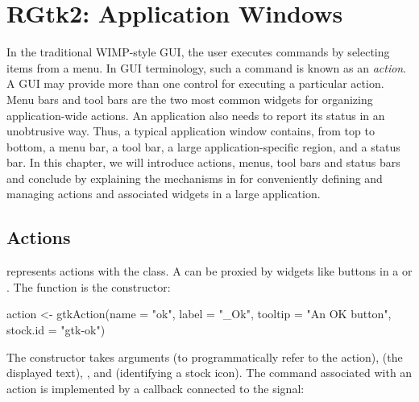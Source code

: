 




\chapter{RGtk2: Application Windows}
\label{sec:RGtk2-menus}


In the traditional WIMP-style GUI, the user executes commands by
selecting items from a menu. In GUI terminology, such a command is
known as an \textit{action}. A GUI may provide more than one control
for executing a particular action. Menu bars and tool bars are the two
most common widgets for organizing application-wide actions. An
application also needs to report its status in an unobtrusive
way. Thus, a typical application window contains, from top to bottom, 
a menu bar, a tool bar, a large application-specific region, and a
status bar.  In this chapter, we will introduce actions, menus,
tool bars and status bars and conclude by explaining the mechanisms in
\GTK\/ for conveniently defining and managing actions and associated
widgets in a large application.


\section{Actions}
\label{sec:RGtk2:actions}


\GTK\/ represents actions with the  class. A
 can be proxied by widgets like buttons in a
 or .  The 
function is the constructor:
\begin{Schunk}
\begin{Sinput}
 action <- gtkAction(name = "ok", label = "_Ok", 
              tooltip = "An OK button", stock.id = "gtk-ok")
\end{Sinput}
\end{Schunk}
%
The constructor takes arguments  (to
programmatically refer to the action), 
(the displayed text), , and
 (identifying a stock icon).  The
command associated with an action is implemented by a callback
connected to the  signal:
\begin{Schunk}
\end{Schunk}


